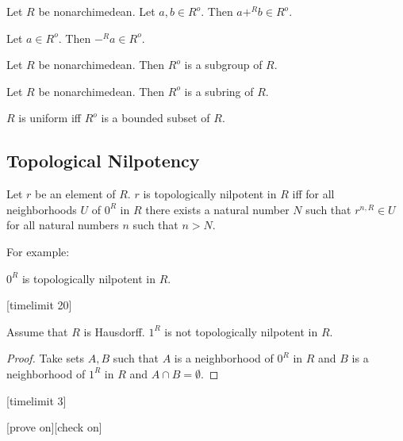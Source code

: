 \documentclass[english,11pt]{article}
\begin{document}
\begin{forthel}
\begin{lemma}[title = L 337] Let $R$ be nonarchimedean.
Let $a,b \in R^o$. Then $a +^{R} b \in R^o$.
\end{lemma}

\begin{lemma}[title = L 342]
Let $a \in R^o$. Then $-^{R} a \in R^o$.
\end{lemma}

\begin{lemma}[title = L 365] Let $R$ be nonarchimedean. Then
$R^o$ is a subgroup of $R$.
\end{lemma}

\begin{lemma}[title = L 371] Let $R$ be nonarchimedean. Then
$R^o$ is a subring of $R$.
\end{lemma}


\begin{definition}[title =  380]
$R$ is uniform iff $R^o$ is a bounded subset of $R$.
\end{definition}

\end{forthel}
\subsection{Topological Nilpotency}
\begin{forthel}


\begin{definition}[title = L 30] Let $r$ be an element of $R$. $r$ is topologically
nilpotent in $R$ iff for all neighborhoods $U$ of $0^{R}$ in $R$
there exists a natural number $N$ such that $r^{n,R} \in U$ 
for all natural numbers $n$
such that $n > N$.
\end{definition}

\end{forthel}
For example:
\begin{forthel}

\begin{lemma}
$0^{R}$ is topologically nilpotent in $R$.
\end{lemma}

[timelimit 20]
\begin{lemma} Assume that $R$ is Hausdorff.
$1^{R}$ is not topologically nilpotent in $R$.
\end{lemma}
\begin{proof}
Take sets $A,B$ such that $A$ is a neighborhood of $0^{R}$ in $R$
and $B$ is a neighborhood of $1^{R}$ in $R$ and
$A \cap B = \emptyset$.
\end{proof}
[timelimit 3]

[prove on][check on]
\end{forthel}
\end{document}

